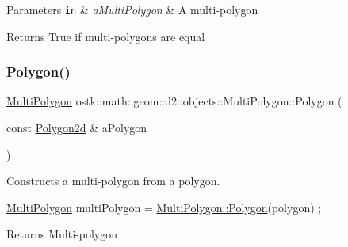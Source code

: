 \begin{DoxyParams}[1]{Parameters}
\mbox{\tt in}  & {\em a\+Multi\+Polygon} & A multi-\/polygon \\
\hline
\end{DoxyParams}
\begin{DoxyReturn}{Returns}
True if multi-\/polygons are equal 
\end{DoxyReturn}
\mbox{\label{classostk_1_1math_1_1geom_1_1d2_1_1objects_1_1_multi_polygon_acbc10ee102e1a22862ec02842fff0506}} 
\subsubsection{\texorpdfstring{Polygon()}{Polygon()}}
{\footnotesize\ttfamily \hyperlink{classostk_1_1math_1_1geom_1_1d2_1_1objects_1_1_multi_polygon}{Multi\+Polygon} ostk\+::math\+::geom\+::d2\+::objects\+::\+Multi\+Polygon\+::\+Polygon (\begin{DoxyParamCaption}\item[{const \hyperlink{namespaceostk_1_1math_1_1geom_1_1d2_1_1objects_a5786a3021d23f9c64937e263a2da9d27}{Polygon2d} \&}]{a\+Polygon }\end{DoxyParamCaption})\hspace{0.3cm}{\ttfamily [static]}}



Constructs a multi-\/polygon from a polygon. 


\begin{DoxyCode}
\hyperlink{classostk_1_1math_1_1geom_1_1d2_1_1objects_1_1_multi_polygon_a70327c4d3f7f19f5ae9b32c0a715f1fd}{MultiPolygon} multiPolygon = \hyperlink{classostk_1_1math_1_1geom_1_1d2_1_1objects_1_1_multi_polygon_acbc10ee102e1a22862ec02842fff0506}{MultiPolygon::Polygon}(polygon) ;
\end{DoxyCode}


\begin{DoxyReturn}{Returns}
Multi-\/polygon 
\end{DoxyReturn}
\mbox{\label{classostk_1_1math_1_1geom_1_1d2_1_1objects_1_1_multi_polygon_ab7a22decd4f9409b08e1b0e6b2bd60ef}} 
